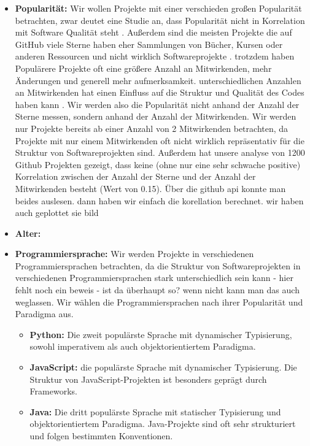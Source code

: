 \begin{itemize}
    \item \textbf{Popularität:} Wir wollen Projekte mit einer verschieden großen Popularität betrachten, zwar deutet eine Studie an, dass Popularität nicht in Korrelation mit Software Qualität steht \cite{popAndQuality}. Außerdem sind die meisten Projekte die auf GitHub viele Sterne haben eher Sammlungen von Bücher, Kursen oder anderen Ressourcen und nicht wirklich Softwareprojekte \cite{evanli_github-ranking_2025}.
    trotzdem haben Populärere Projekte oft eine größere Anzahl an Mitwirkenden, mehr Änderungen und generell mehr aufmerksamkeit. 
    unterschiedlichen Anzahlen an Mitwirkenden hat einen Einfluss auf die Struktur und Qualität des Codes haben kann \cite{numDevs}. Wir werden also die Popularität nicht anhand der Anzahl der Sterne messen, sondern anhand der Anzahl der Mitwirkenden. Wir werden nur Projekte bereits ab einer Anzahl von 2 Mitwirkenden betrachten, da Projekte mit nur einem Mitwirkenden oft nicht wirklich repräsentativ für die Struktur von Softwareprojekten sind. Außerdem hat unsere analyse von 1200 Github Projekten gezeigt, dass keine (ohne nur eine sehr schwache positive) Korrelation zwischen der Anzahl der Sterne und der Anzahl der Mitwirkenden besteht (Wert von 0.15). Über die github api konnte man beides auslesen. dann haben wir einfach die korellation berechnet. wir haben auch geplottet sie bild
    \item \textbf{Alter:}
    \item \textbf{Programmiersprache:} Wir werden Projekte in verschiedenen Programmiersprachen betrachten, da die Struktur von Softwareprojekten in verschiedenen Programmiersprachen stark unterschiedlich sein kann - hier fehlt noch ein beweis - ist da überhaupt so? wenn nicht kann man das auch weglassen. Wir wählen die Programmiersprachen nach ihrer Popularität und Paradigma aus. 
    \begin{itemize}
        \item \textbf{Python:} Die zweit populärste Sprache \cite{software_state_2022} mit dynamischer Typisierung, sowohl imperativem als auch objektorientiertem Paradigma. 
        \item \textbf{JavaScript:} die populärste Sprache \cite{software_state_2022} mit dynamischer Typisierung. Die Struktur von JavaScript-Projekten ist besonders geprägt durch Frameworks.
        \item \textbf{Java:} Die dritt populärste Sprache \cite{software_state_2022} mit statischer Typisierung und objektorientiertem Paradigma. Java-Projekte sind oft sehr strukturiert und folgen bestimmten Konventionen.

\end{itemize}
\end{itemize}
